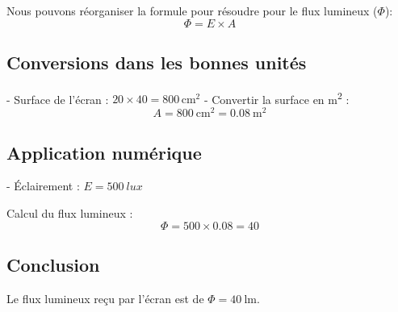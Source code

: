 \documentclass[answers]{exam}
\begin{document}
\begin{solution}
\begin{questions}
Nous pouvons réorganiser la formule pour résoudre pour le flux lumineux (\(\Phi\)):
\[
\Phi = E \times A
\]

\subsection{Conversions dans les bonnes unités}

- Surface de l'écran : \(20 \times 40 = 800 \, \si{\centi\meter\squared}\)
- Convertir la surface en \si{\meter\squared} :
  \[
  A = \SI{800}{\centi\meter\squared} = \SI{0.08}{\meter\squared}
  \]

\subsection{Application numérique}

- Éclairement : \(E = \SI{500}{lux}\)

Calcul du flux lumineux :
\[
\Phi = 500 \times 0.08 = 40
\]

\subsection{Conclusion}

Le flux lumineux reçu par l'écran est de \(\Phi = \SI{40}{\lumen}\).

\end{questions}

\end{solution}
\end{document}

